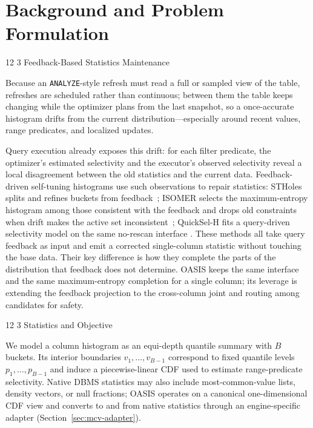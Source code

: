 \documentclass[preprint,12pt]{elsarticle}
\makeatletter
\renewcommand\subsection{\@startsection{subsection}{2}{\z@}%
           {12\p@ \@plus 6\p@ \@minus 3\p@}%
           {3\p@ \@plus 6\p@ \@minus 3\p@}%
           {\normalfont\normalsize\bfseries}}
\makeatother
\begin{document}
\section{Background and Problem Formulation}
\label{sec:background}

\subsection{Feedback-Based Statistics Maintenance}
\label{sec:scenario}

Because an \texttt{ANALYZE}-style refresh must read a full or sampled view of the table,
refreshes are scheduled rather than continuous; between them the table keeps changing
while the optimizer plans from the last snapshot, so a once-accurate histogram drifts from
the current distribution---especially around recent values, range predicates, and
localized updates.

Query execution already exposes this drift: for each filter predicate, the optimizer's
estimated selectivity and the executor's observed selectivity reveal a local disagreement
between the old statistics and the current data.
Feedback-driven self-tuning histograms use such observations to repair statistics: STHoles
splits and refines buckets from feedback~\cite{bruno2001stholes}; ISOMER selects the
maximum-entropy histogram among those consistent with the feedback and drops old
constraints when drift makes the active set inconsistent~\cite{markl2007consistent};
QuickSel-H fits a query-driven selectivity model on the same no-rescan interface
\cite{park2020quicksel}. These methods all take query feedback as input and emit a
corrected single-column statistic without touching the base data. Their key difference is
how they complete the parts of the distribution that feedback does not determine. OASIS
keeps the same interface and the same maximum-entropy completion for a single column; its
leverage is extending the feedback projection to the cross-column joint and routing among
candidates for safety.

\subsection{Statistics and Objective}

We model a column histogram as an equi-depth quantile summary with $B$ buckets. Its
interior boundaries $v_1,\ldots,v_{B-1}$ correspond to fixed quantile levels
$p_1,\ldots,p_{B-1}$ and induce a piecewise-linear CDF used to estimate range-predicate
selectivity. Native DBMS statistics may also include most-common-value lists, density
vectors, or null fractions; OASIS operates on a canonical one-dimensional CDF view and
converts to and from native statistics through an engine-specific adapter
(Section~\ref{sec:mcv-adapter}).
\end{document}
